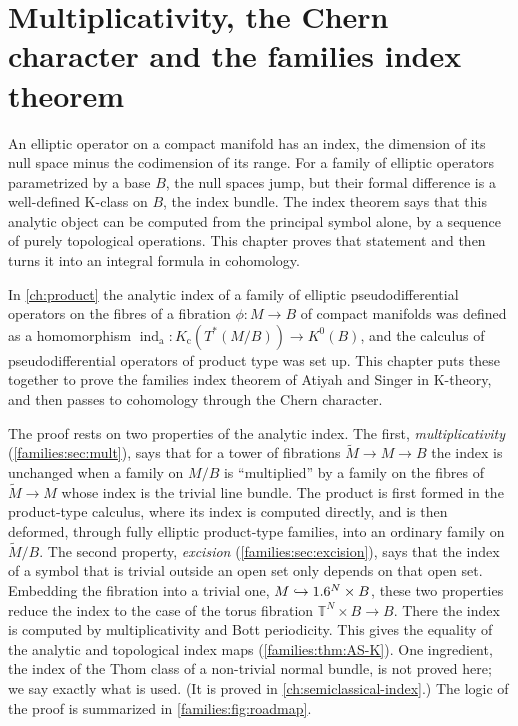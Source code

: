 \chapter{Multiplicativity, the Chern character and the families index theorem}\label{ch:families}
\providecommand{\Ch}{\operatorname{Ch}}
\providecommand{\Chodd}{\operatorname{Ch}_{\mathrm{odd}}}
\providecommand{\Td}{\operatorname{Td}}
\providecommand{\Kc}{K_{\mathrm{c}}}
\providecommand{\inda}{\operatorname{ind}_{\mathrm{a}}}
\providecommand{\indt}{\operatorname{ind}_{\mathrm{t}}}
\providecommand{\Hev}{H^{\mathrm{ev}}}
\providecommand{\Hodd}{H^{\mathrm{odd}}}
\providecommand{\Psiptfam}[1]{\Psi^{#1}_{\tilde\phi\text{-}\mathrm{pt}}}
\providecommand{\Torus}{\mathbb{T}}
\providecommand{\Hardy}{\mathcal{C}^\infty_{+}}
\providecommand{\Ginf}{G^{-\infty}}

An elliptic operator on a compact manifold has an index, the dimension of its
null space minus the codimension of its range. For a family of elliptic operators
parametrized by a base $B$, the null spaces jump, but their formal difference
is a well-defined K-class on $B$, the index bundle. The index theorem says that
this analytic object can be computed from the principal symbol alone, by a
sequence of purely topological operations. This chapter proves that statement
and then turns it into an integral formula in cohomology.

In \cref{ch:product} the analytic index of a family of elliptic
pseudodifferential operators on the fibres of a fibration $\phi:M\to B$ of
compact manifolds was defined as a homomorphism
$\inda:\Kc(T^*(M/B))\to K^0(B)$, and the calculus of pseudodifferential
operators of product type was set up. This chapter puts these together to
prove the families index theorem of Atiyah and Singer in K-theory, and then
passes to cohomology through the Chern character.

The proof rests on two properties of the analytic index. The first,
\emph{multiplicativity} (\cref{families:sec:mult}), says that for a tower of
fibrations $\tilde M\to M\to B$ the index is unchanged when a family on
$M/B$ is ``multiplied'' by a family on the fibres of $\tilde M\to M$ whose
index is the trivial line bundle. The product is first formed in the
product-type calculus, where its index is computed directly, and is then
deformed, through fully elliptic product-type families, into an ordinary
family on $\tilde M/B$. The second property, \emph{excision}
(\cref{families:sec:excision}), says that the index of a symbol that is
trivial outside an open set only depends on that open set. Embedding the
fibration into a trivial one, $M\hookrightarrow1.6^N\times B$, these two
properties reduce the index to the case of the torus fibration
$\Torus^N\times B\to B$. There the index is computed by multiplicativity and
Bott periodicity. This gives the equality of the analytic and topological
index maps (\cref{families:thm:AS-K}). One ingredient, the index of the Thom
class of a non-trivial normal bundle, is not proved here; we say exactly what
is used. (It is proved in \cref{ch:semiclassical-index}.) The logic of the proof
is summarized in \cref{families:fig:roadmap}.

